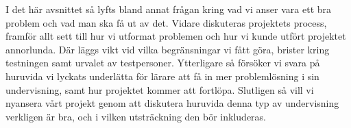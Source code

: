 \textcolor{Mahogany}{
    I det här avsnittet så lyfts bland annat frågan kring vad vi anser vara ett bra problem och vad man ska få ut av det. Vidare diskuteras projektets process, framför allt sett till hur vi utformat problemen och hur vi kunde utfört projektet annorlunda. Där läggs vikt vid vilka begränsningar vi fått göra, brister kring testningen samt urvalet av testpersoner.
    Ytterligare så försöker vi svara på huruvida vi lyckats underlätta för lärare att få in mer problemlösning i sin undervisning, samt hur projektet kommer att fortlöpa. Slutligen så vill vi nyansera vårt projekt genom att diskutera huruvida denna typ av undervisning verkligen är bra, och i vilken utsträckning den bör inkluderas.
}